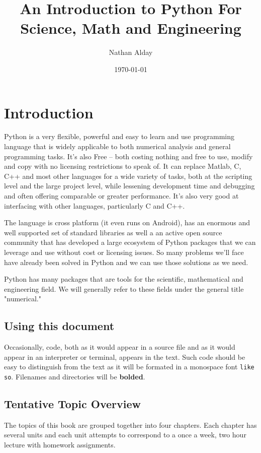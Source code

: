 \documentclass{report}
\begin{document}
\title{An Introduction to Python For Science, Math and Engineering}
\author{Nathan Alday}
\date{\today}
\maketitle

\chapter{Introduction}
Python is a very flexible, powerful and easy to learn and use programming language that is widely applicable to both numerical analysis and general programming tasks. It's also Free -- both costing nothing and free to use, modify and copy with no licensing restrictions to speak of. It can replace Matlab, C, C++ and most other languages for a wide variety of tasks, both at the scripting level and the large project level,  while lessening development time and debugging and often offering comparable or greater performance. It's also very good at interfacing with other languages, particularly C and C++. 

The language is cross platform (it even runs on Android), has an enormous and well supported set of standard libraries as well a an active open source community that has developed a large ecosystem of Python packages that we can leverage and use without cost or licensing issues. So many problems we'll face have already been solved in Python and we can use those solutions as we need.

Python has many packages that are tools for the scientific, mathematical and engineering field. We will generally refer to these fields under the general title "numerical."

\section{Using this document}

Occasionally, code, both as it would appear in a source file and as it would appear in an interpreter or terminal, appears in the text. Such code should be easy to distinguish from the text as it will be formated in a monospace font \verb|like so|. Filenames and directories will be \textbf{bolded}.

\section{Tentative Topic Overview}

The topics of this book are grouped together into four chapters. Each chapter has several units and each unit attempts to correspond to a once a week, two hour lecture with homework assignments. 
\end{document}

